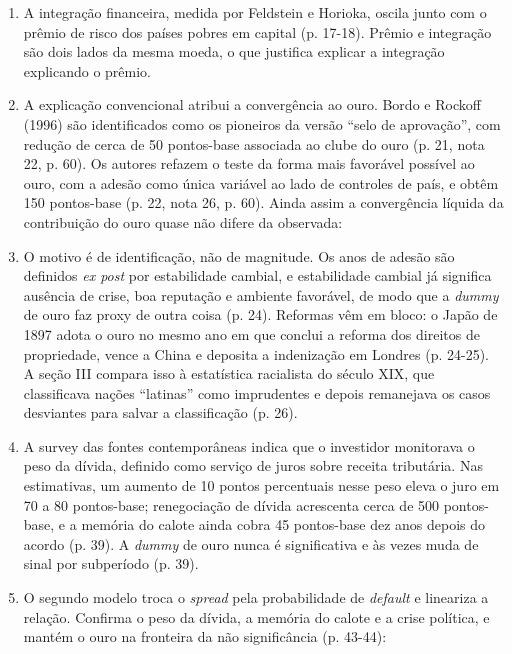 \begin{enumerate}[leftmargin=*,nosep]
\item A integração financeira, medida por Feldstein e Horioka, oscila junto com
o prêmio de risco dos países pobres em capital (p. 17-18). Prêmio e integração
são dois lados da mesma moeda, o que justifica explicar a integração
explicando o prêmio.
\item A explicação convencional atribui a convergência ao ouro. Bordo e
Rockoff (1996) são identificados como os pioneiros da versão ``selo de
aprovação'', com redução de cerca de 50 pontos-base associada ao clube do ouro
(p. 21, nota 22, p. 60). Os autores refazem o teste da forma mais favorável
possível ao ouro, com a adesão como única variável ao lado de controles de
país, e obtêm 150 pontos-base (p. 22, nota 26, p. 60). Ainda assim a
convergência líquida da contribuição do ouro quase não difere da observada:
\item O motivo é de identificação, não de magnitude. Os anos de adesão são
definidos \emph{ex post} por estabilidade cambial, e estabilidade cambial já
significa ausência de crise, boa reputação e ambiente favorável, de modo que a
\emph{dummy} de ouro faz proxy de outra coisa (p. 24). Reformas vêm em bloco: o
Japão de 1897 adota o ouro no mesmo ano em que conclui a reforma dos direitos
de propriedade, vence a China e deposita a indenização em Londres (p. 24-25).
A seção III compara isso à estatística racialista do século XIX, que
classificava nações ``latinas'' como imprudentes e depois remanejava os casos
desviantes para salvar a classificação (p. 26).
\item A survey das fontes contemporâneas indica que o investidor monitorava o
peso da dívida, definido como serviço de juros sobre receita tributária. Nas
estimativas, um aumento de 10 pontos percentuais nesse peso eleva o juro em 70
a 80 pontos-base; renegociação de dívida acrescenta cerca de 500 pontos-base, e
a memória do calote ainda cobra 45 pontos-base dez anos depois do acordo
(p. 39). A \emph{dummy} de ouro nunca é significativa e às vezes muda de sinal
por subperíodo (p. 39).
\item O segundo modelo troca o \emph{spread} pela probabilidade de \emph{default}
e lineariza a relação. Confirma o peso da dívida, a memória do calote e a
crise política, e mantém o ouro na fronteira da não significância (p. 43-44):

\end{enumerate}
